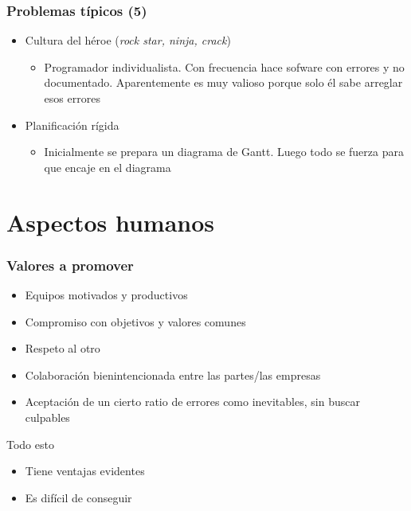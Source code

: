 \documentclass[ucs]{beamer}
\begin{document}
\begin{frame}[fragile]
\frametitle{Problemas típicos (5)}
\begin{itemize}
\item
Cultura del héroe
(\emph{rock star, ninja, crack})

\begin{itemize}
\item
Programador individualista. Con frecuencia hace sofware con errores y no documentado.
Aparentemente es muy valioso porque solo él sabe arreglar
esos errores
\end{itemize}

\item
Planificación rígida

\begin{itemize}
\item
Inicialmente se prepara un 
diagrama de Gantt.
Luego todo se fuerza para que encaje en el diagrama
\end{itemize}
\end{itemize}
\end{frame}


\section{Aspectos humanos}
\begin{frame}[fragile]
\frametitle{Valores a promover}
\begin{itemize}
\item
Equipos motivados y productivos

\item
Compromiso con objetivos y valores comunes

\item
Respeto al otro

\item
Colaboración bienintencionada entre
las partes/las empresas

\item
Aceptación de un 
cierto ratio
de errores como inevitables, sin buscar culpables
\end{itemize}

Todo esto

\begin{itemize}
\item
Tiene ventajas evidentes
\item
Es difícil de conseguir
\end{itemize}
\end{frame}
\end{document}
